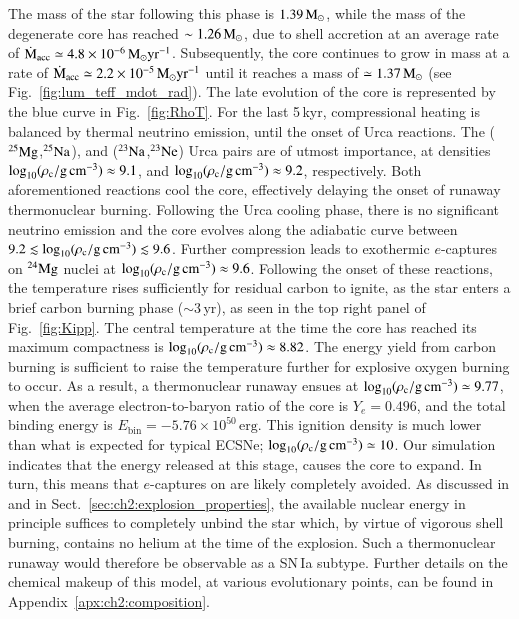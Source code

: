 \documentclass[main.tex]{subfiles}
\begin{document}
The  mass of the star following this phase is $1.39\mathrm{\,M_\odot}$, 
while the mass of the degenerate core has reached  $\sim 1.26\mathrm{\,M_\odot}$, due to shell accretion 
at an average rate of $\rm \dot{M}_{\rm acc} \simeq 4.8 \times 10^{-6} \mathrm{\,M_\odot} yr^{-1}$. 
Subsequently, the core continues to grow in mass at a rate 
of $\rm \dot{M}_{\rm acc} \simeq 2.2 \times 10^{-5} \mathrm{\,M_\odot} yr^{-1}$ 
until it reaches a  mass  of $\simeq 1.37\mathrm{\,M_\odot}$ (see Fig.~\ref{fig:lum_teff_mdot_rad}). 
The late evolution of the core is represented by the blue curve in Fig.~\ref{fig:RhoT}. 
For the last 5\,kyr, compressional heating is balanced by thermal 
neutrino emission, until the onset of Urca 
reactions. The ($\rm ^{25}Mg$,$\rm ^{25}Na$), and ($\rm ^{23}Na$,$\rm ^{23}Ne$) Urca pairs are of utmost importance, at 
densities $\rm \log_{10} (\rho_{\mathrm{c}}/ \mathrm{g\,cm^{-3}}) \approx 9.1$, and 
$\rm \log_{10} (\rho_{\mathrm{c}}/ \mathrm{g\,cm^{-3}}) \approx 9.2$, respectively. 
Both aforementioned reactions cool the core, effectively delaying the onset of runaway thermonuclear burning. 
Following the Urca cooling phase, there is no significant neutrino emission and the 
core evolves along the adiabatic curve 
between $9.2 \lesssim \log_{10} (\rho_{\mathrm{c}}/ \mathrm{g\,cm^{-3}}) \lesssim 9.6$. 
Further compression leads to exothermic $e$-captures on $\rm ^{24}Mg$ nuclei at $\rm \log_{10} (\rho_{\mathrm{c}}/ \mathrm{g\,cm^{-3}}) \approx 9.6$. 
Following the onset of these reactions, the temperature rises sufficiently for residual carbon to ignite, as the star enters a brief carbon burning phase ($\sim$3\,yr),
as seen in the top right panel of Fig.~\ref{fig:Kipp}.
The central temperature at the time the core has reached its maximum compactness is $\rm \log_{10} (\rho_{\mathrm{c}}/ \mathrm{g\,cm^{-3}}) \approx 8.82$. 
The energy yield from carbon burning is sufficient to raise the temperature further for 
explosive oxygen burning  to occur. As a result, a thermonuclear runaway ensues at 
$\log_{10} (\rho_{\mathrm{c}}/ \mathrm{g\,cm^{-3}}) \simeq 9.77$, when the average electron-to-baryon ratio of the core is 
$Y_e = 0.496$, and  the total binding energy is $E_{\text{bin}} = - 5.76 \times 10^{50}\,\text{erg}$. 
This ignition density is much lower than what is expected for typical ECSNe; $\log_{10} (\rho_{\mathrm{c}}/ \mathrm{g\,cm^{-3}}) \simeq 10$. 
Our simulation indicates that the energy released at this stage, causes the core to expand.
In turn, this means that $e$-captures on  are likely completely avoided.  
As discussed in  and in Sect.~\ref{sec:ch2:explosion_properties}, 
the available nuclear energy in principle suffices to completely unbind the star which, 
by virtue of vigorous shell burning, contains no helium at the time of the explosion. 
Such a thermonuclear runaway would therefore be observable as a SN\,Ia subtype. 
Further details on the chemical makeup of this model, at various 
evolutionary points, can be found in Appendix~\ref{apx:ch2:composition}.
\end{document}
